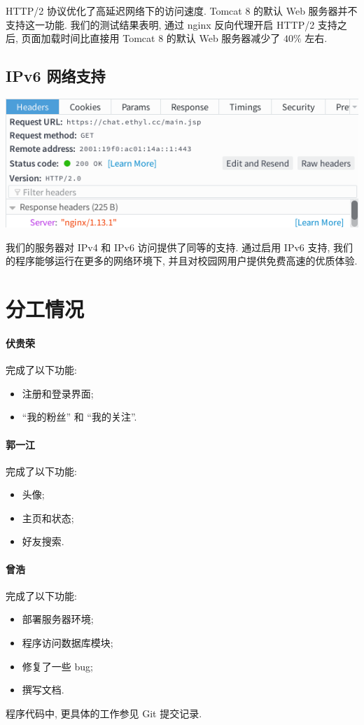 \documentclass[a4paper,10pt]{article}
\begin{document}
HTTP/2 协议优化了高延迟网络下的访问速度. Tomcat 8 的默认 Web 服务器并不支持这一功能. 我们的测试结果表明, 通过 nginx 反向代理开启 HTTP/2 支持之后, 页面加载时间比直接用 Tomcat 8 的默认 Web 服务器减少了 $40\%$ 左右.

\subsection{IPv6 网络支持}

\begin{center}
	\includegraphics[scale=0.6]{h2+ipv6.png}
\end{center}

我们的服务器对 IPv4 和 IPv6 访问提供了同等的支持. 通过启用 IPv6 支持, 我们的程序能够运行在更多的网络环境下, 并且对校园网用户提供免费高速的优质体验.

\section{分工情况}

\paragraph{伏贵荣}
完成了以下功能:
\begin{itemize}
	\item 注册和登录界面;
	\item ``我的粉丝'' 和 ``我的关注''.
\end{itemize}

\paragraph{郭一江}
完成了以下功能:
\begin{itemize}
	\item 头像;
	\item 主页和状态;
	\item 好友搜索.
\end{itemize}

\paragraph{曾浩}
完成了以下功能:
\begin{itemize}
	\item 部署服务器环境;
	\item 程序访问数据库模块;
	\item 修复了一些 bug;
	\item 撰写文档.
\end{itemize}

程序代码中, 更具体的工作参见 Git 提交记录.
\end{document}
